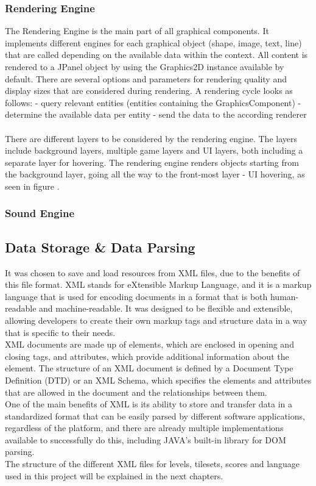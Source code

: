 \subsubsection{Rendering Engine}\label{subsubsec:graphics-engine}
The Rendering Engine is the main part of all graphical components.
It implements different engines for each graphical object (shape, image, text, line) that are called depending on the available data within the
context.
All content is rendered to a JPanel object by using the Graphics2D instance available by default.
There are several options and parameters for rendering quality and display sizes that are considered during rendering.
A rendering cycle looks as follows:
- query relevant entities (entities containing the GraphicsComponent)
- determine the available data per entity
- send the data to the according renderer
\\ \\
There are different layers to be considered by the rendering engine.
The layers include background layers, multiple game layers and UI layers, both including a separate layer for hovering.
The rendering engine renders objects starting from the background layer, going all the way to the front-most layer - UI hovering, as seen in figure
.

\subsubsection{Sound Engine}\label{subsubsec:sound-engine}

\subsection{Data Storage \& Data Parsing}\label{subsec:data-storage-&-data-parsing}
It was chosen to save and load resources from XML files, due to the benefits of this file format.
XML stands for eXtensible Markup Language, and it is a markup language that is used for encoding documents in a format that is both human-readable and machine-readable.
It was designed to be flexible and extensible, allowing developers to create their own markup tags and structure data in a way that is specific to their needs.
\\
XML documents are made up of elements, which are enclosed in opening and closing tags, and attributes, which provide additional information about the element.
The structure of an XML document is defined by a Document Type Definition (DTD) or an XML Schema, which specifies the elements and attributes that are allowed in the document and the relationships between them.
\\
One of the main benefits of XML is its ability to store and transfer data in a standardized format that can be easily parsed by different software applications, regardless of the platform, and there are
already multiple implementations available to successfully do this, including JAVA's built-in library for DOM parsing.
\\
The structure of the different XML files for levels, tilesets, scores and language used in this project will be explained in the next chapters.
